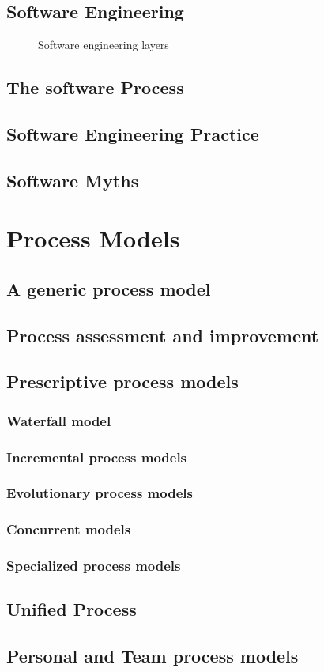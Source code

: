 \documentclass{article}
\begin{document}
	\subsection{Software Engineering}
	\begin{figure}[H]
		\centering
		
		\caption{Software engineering layers}
	\end{figure}
	\subsection{The software Process}
	\subsection{Software Engineering Practice}
	\subsection{Software Myths}

	\section{Process Models}
	\subsection{A generic process model}
	\subsection{Process assessment and improvement}

	\subsection{Prescriptive process models}
	\subsubsection{Waterfall model}
	\subsubsection{Incremental process models}
	\subsubsection{Evolutionary process models}
	\subsubsection{Concurrent models}
	\subsubsection{Specialized process models}
	\subsection{Unified Process}
	\subsection{Personal and Team process models}
\end{document}
